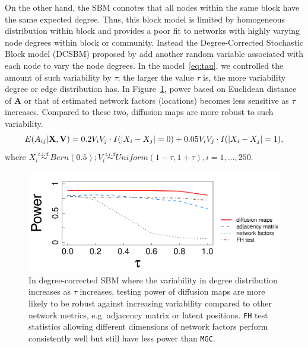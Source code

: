\documentclass[11pt]{article}
\theoremstyle{definition}
\begin{document}
On the other hand, the SBM connotes that all nodes within the same block have the same expected degree. Thus, this block model is limited by homogeneous distribution within block and provides a poor fit to networks with highly varying node degrees within block or community. Instead the Degree-Corrected Stochastic Block model (DCSBM) proposed by \cite{karrer2011stochastic} add another random variable associated with each node to vary the node degrees. In the model~\ref{eq:tau}, we controlled the amount of such variability by $\tau$; the larger the value $\tau$ is, the more variability degree or edge distribution has. In Figure~\ref{fig:dcSBM}, power based on Euclidean distance of $\mathbf{A}$ or that of estimated network factors (locations) becomes less sensitive as $\tau$ increases. Compared to these two, diffusion maps are more robust to such variability. 
\vspace*{-0.4cm}
\begin{equation}
E( A_{ij} | \mathbf{X}, \mathbf{V} )  = 0.2 V_{i} V_{j} \cdot I ( |X_{i} - X_{j}| = 0 ) + 0.05 V_{i} V_{j} \cdot I(|X_{i} - X_{j}| = 1),
\label{eq:tau}
\vspace*{-0.4cm}
\end{equation} 
where $X_{i} \overset{i.i.d.}{\sim} Bern(0.5);  V_{i} \overset{i.i.d}{\sim} Uniform(1 - \tau, 1 + \tau), i = 1, \ldots, 250.$
\begin{figure}[ht]
	\centering
	\includegraphics[width=0.7\linewidth]{../Figure/tau_simple.pdf}
	\caption{In degree-corrected SBM where the variability in degree distribution increases as $\tau$ increases, testing power of diffusion maps are more likely to be robust against increasing variability compared to other network metrics, e.g. adjacency matrix or latent positions. \texttt{FH} test statistics allowing different dimensions of network factors perform consistently well but still have less power than \texttt{MGC}.}
	\label{fig:dcSBM}
	\vspace*{-0.5cm}
\end{figure}	
\end{document}
